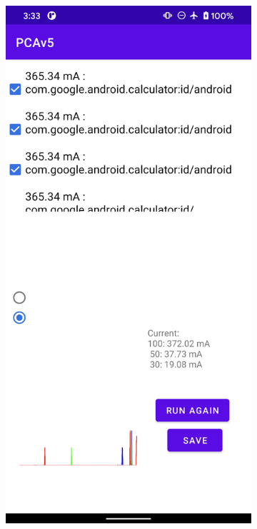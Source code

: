 \begin{figure}[tp]
\begin{subfigure}[]{0.30\columnwidth}
	\end{subfigure}
        \hfill 
	\begin{subfigure}[]{0.30\columnwidth}
		\includegraphics[width=\textwidth]{figure/003_app_histogram.png}

\end{subfigure}
\end{figure}
